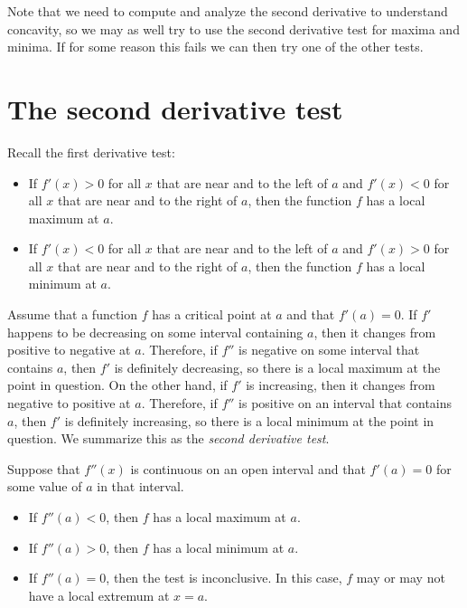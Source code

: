 \documentclass{ximera}
\begin{document}
Note that we need to compute and analyze the second derivative to
understand concavity, so we may as well try to use the second
derivative test for maxima and minima. If for some reason this fails
we can then try one of the other tests.

\section{The second derivative test}


Recall the first derivative test:

\begin{itemize}
\item If $f'(x)>0$ for all $x$ that are near and to the left of $a$ and $f'(x)<0$  for all $x$ that are near and to the right of
  $a$, then the function $f$ has a local maximum at $a$.
\item If $f'(x)<0$ for all $x$ that are near and  to the left of $a$ and $f'(x)>0$ for all $x$ that are near and  to the right of
  $a$, then the function $f$ has a local minimum at $a$.
\end{itemize}

Assume that a function $f$ has  a critical point at $a$ and that $f'(a)=0$.
If $f'$  happens to be decreasing on some interval containing $a$, then it changes from positive to negative at $a$. 
Therefore, if $f''$ is negative on some interval that contains $a$,
then $f'$ is definitely decreasing, so there is a local maximum at
the point in question. On the other hand, if $f'$ is increasing, then it changes from
negative to positive at $a$. Therefore,
if $f''$ is positive on an interval that contains $a$, then
$f'$ is definitely increasing, so there is a local minimum at the
point in question. We summarize this as the \textit{second derivative
  test}.

\begin{theorem}\label{T:sdt}
Suppose that $f''(x)$ is continuous on an open interval and that
$f'(a)=0$ for some value of $a$ in that interval.
\begin{itemize}
\item If $f''(a) <0$, then $f$ has a local maximum at $a$.
\item If $f''(a) >0$, then $f$ has a local minimum at $a$.
\item If $f''(a) =0$, then the test is inconclusive. In this case,
  $f$ may or may not have a local extremum at $x=a$.
\end{itemize}
\end{theorem}
\end{document}
